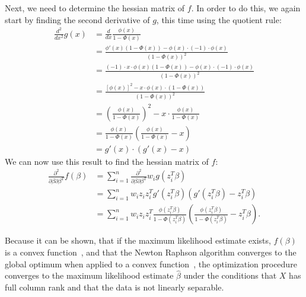 \noindent Next, we need to determine the hessian matrix of $f$. In order to do this,
we again start by finding the second derivative of $g$, this time
using the quotient rule:
\begin{equation}
    \begin{split}
        \frac{d^2}{dx^2}g(x)
        & = \frac{d}{dx} \frac{\phi(x)}{1 - \Phi(x)} \\
        & = \frac{\phi'(x)(1 - \Phi(x)) - \phi(x) \cdot (-1) \cdot \phi(x)}
        {(1 - \Phi(x))^2} \\
        & = \frac{(-1) \cdot x \cdot \phi(x)(1 - \Phi(x)) - \phi(x) \cdot (-1) \cdot \phi(x)}
        {(1 - \Phi(x))^2} \\
        & = \frac{[\phi(x)]^2 - x \cdot \phi(x) \cdot (1 - \Phi(x))}{(1 - \Phi(x))^2} \\
        & = \left(\frac{\phi(x)}{1 - \Phi(x)}\right)^2 - x \cdot \frac{\phi(x)}{1 - \Phi(x)} \\
        & = \frac{\phi(x)}{1 - \Phi(x)} \left( \frac{\phi(x)}{1 - \Phi(x)} - x \right)  \\
        & = g'(x) \cdot (g'(x) - x)
    \end{split}
\end{equation}
We can now use this result to find the hessian matrix of $f$:
\begin{equation}
    \begin{split}
        \frac{\partial^2}{\partial \beta \partial \beta^T} f(\beta)
        & = \sum_{i=1}^n
        \frac{\partial^2}{\partial \beta \partial \beta^T} w_i g(z_i^T \beta)\\
        & = \sum_{i=1}^n w_i z_i z_i^T g'(z_i^T \beta)(g'(z_i^T \beta) - z_i^T \beta)\\
        & = \sum_{i=1}^n w_i z_i z_i^T
        \frac{\phi(z_i^T \beta)}{1 - \Phi(z_i^T \beta)} \left( \frac{\phi(z_i^T \beta)}{1 - \Phi(z_i^T \beta)} - z_i^T \beta \right).
    \end{split}
\end{equation}

\noindent Because it can be shown, that
if the maximum likelihood estimate exists,
$f(\beta)$ is a convex function~\cite{wedderburn},
and that the Newton Raphson algorithm converges to
the global optimum when applied to a convex
function~\cite{numerical-optimization},
the optimization procedure converges to the
maximum likelihood estimate $\hat{\beta}$ under the conditions that
$X$ has full column rank and that the data is not linearly separable.

